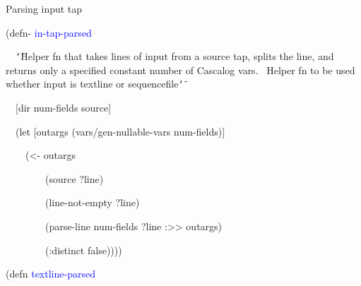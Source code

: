 \documentclass{beamer}
\renewcommand{\textquotedbl}{\texttt{\char`\"}}
\begin{document}
\begin{frame}[allowframebreaks]{Parsing input tap}

\begin{small}
{\ttfamily\color{black}
\textcolor[rgb]{0.54901963,0.54901963,0.54901963}{(}\textcolor[rgb]{0.49803922,0.0,0.49803922}{defn-}
\textcolor{blue}{in-tap-parsed}}

{\ttfamily\color{black}
\ \ \textcolor[rgb]{0.54509807,0.13333334,0.32156864}{{\textquotedbl}Helper
fn that takes lines of input from a source tap, splits the line, and
returns only a specified constant number of Cascalog vars. \ Helper fn
to be used whether input is textline or sequencefile{\textquotedbl}}}

{\ttfamily\color{black}
\ \ [dir num-fields source]}

{\ttfamily\color{black}
\ \ \textcolor[rgb]{0.54901963,0.54901963,0.54901963}{(}\textcolor[rgb]{0.49803922,0.0,0.49803922}{let}
[outargs
\textcolor[rgb]{0.54901963,0.54901963,0.54901963}{(}vars/gen-nullable-vars
num-fields\textcolor[rgb]{0.54901963,0.54901963,0.54901963}{)}]}

{\ttfamily\color{black}
\ \ \ \ \textcolor[rgb]{0.54901963,0.54901963,0.54901963}{(}{\textless}-
outargs}

{\ttfamily\color{black}
\ \ \ \ \ \ \ \ \textcolor[rgb]{0.54901963,0.54901963,0.54901963}{(}source
?line\textcolor[rgb]{0.54901963,0.54901963,0.54901963}{)}}

{\ttfamily\color{black}
\ \ \ \ \ \ \ \ \textcolor[rgb]{0.54901963,0.54901963,0.54901963}{(}line-not-empty
?line\textcolor[rgb]{0.54901963,0.54901963,0.54901963}{)}}

{\ttfamily\color{black}
\ \ \ \ \ \ \ \ \textcolor[rgb]{0.54901963,0.54901963,0.54901963}{(}parse-line
num-fields ?line
\textcolor[rgb]{0.0,0.54509807,0.54509807}{:{\textgreater}{\textgreater}}
outargs\textcolor[rgb]{0.54901963,0.54901963,0.54901963}{)}}

{\ttfamily\color{black}
\ \ \ \ \ \ \ \ \textcolor[rgb]{0.54901963,0.54901963,0.54901963}{(}\textcolor[rgb]{0.0,0.54509807,0.54509807}{:distinct}
false\textcolor[rgb]{0.54901963,0.54901963,0.54901963}{))))}}
\end{small}

\framebreak

\begin{small}
{\ttfamily\color{black}
\textcolor[rgb]{0.54901963,0.54901963,0.54901963}{(}\textcolor[rgb]{0.49803922,0.0,0.49803922}{defn}
\textcolor{blue}{textline-parsed}}


\end{small}
\end{frame}
\end{document}
